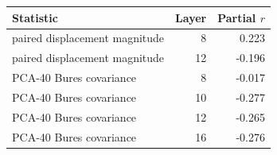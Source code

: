 \begin{tabular}{lrr}
\toprule
Statistic & Layer & Partial $r$ \\
\midrule
paired displacement magnitude & 8 & 0.223 \\
paired displacement magnitude & 12 & -0.196 \\
PCA-40 Bures covariance & 8 & -0.017 \\
PCA-40 Bures covariance & 10 & -0.277 \\
PCA-40 Bures covariance & 12 & -0.265 \\
PCA-40 Bures covariance & 16 & -0.276 \\
\bottomrule
\end{tabular}
